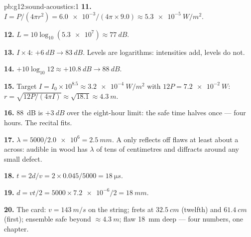 \begin{solution}{pb:g12:sound-acoustics:1}
\textbf{11.} $I = P/(4\pi r^2) = \num{6.0e-3}/(4\pi \times 9.0)
\approx \qty{5.3e-5}{W/m^2}$.

\textbf{12.} $L = 10\log_{10}(\num{5.3e7}) \approx \qty{77}{dB}$.

\textbf{13.} $I \times 4$: $+\qty{6}{dB} \to \qty{83}{dB}$. Levels
are logarithms: intensities add, levels do not.

\textbf{14.} $+10\log_{10}12 \approx +\qty{10.8}{dB} \to
\qty{88}{dB}$.

\textbf{15.} Target $I = I_0 \times 10^{8.5} \approx
\qty{3.2e-4}{W/m^2}$ with $12P = \qty{7.2e-2}{W}$:
$r = \sqrt{12P/(4\pi I)} \approx \sqrt{18.1} \approx \qty{4.3}{m}$.

\textbf{16.} \qty{88}{dB} is $+\qty{3}{dB}$ over the eight-hour
limit: the safe time halves once --- four hours. The recital fits.

\textbf{17.} $\lambda = 5000/\num{2.0e6} = \qty{2.5}{mm}$. A 
only reflects off flaws at least about a  across: audible
 in wood has $\lambda$ of tens of centimetres and diffracts
around any small defect.

\textbf{18.} $t = 2d/v = 2 \times 0.045/5000 = \qty{18}{\micro s}$.

\textbf{19.} $d = vt/2 = 5000 \times \num{7.2e-6}/2 = \qty{18}{mm}$.

\textbf{20.} The card: $v = \qty{143}{m/s}$ on the string; frets at
$\qty{32.5}{cm}$ (twelfth) and $\qty{61.4}{cm}$ (first); ensemble
safe beyond $\approx \qty{4.3}{m}$; flaw \qty{18}{mm} deep --- four
numbers, one chapter.
\end{solution}
